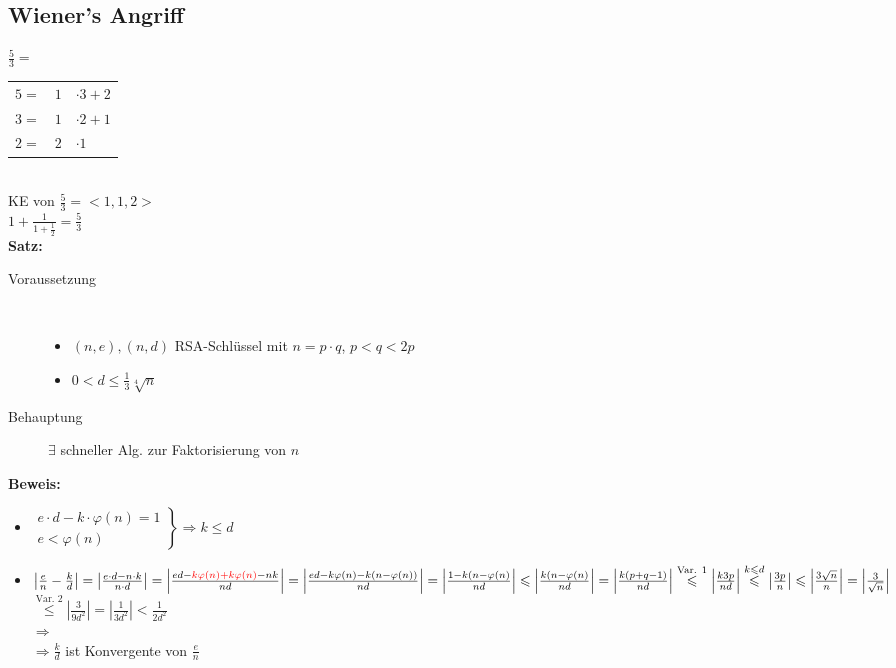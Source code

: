 \documentclass[10pt]{article}
\newcommand{\Bold}[1]{\textbf{#1}} %
\newcommand{\T}[1]{\text{#1}} %
\newcommand{\Ra}{\Rightarrow}
\newcommand{\Abs}[1]{\left| #1 \right|} %
\newcommand{\Brackar}[2]{\left.\begin{array}{#1} #2 \end{array}\right\rbrace} %
\newcommand{\Oneover}[1]{\frac{1}{#1}} %
\newcommand{\Oben}[2]{\overset{#1}{#2}} %
\begin{document}
\subsection{Wiener's Angriff}
$\frac{5}{3}=$\\
\begin{tabular}{l|c|l}\cline{2-1}
 $5=$&$1$&$\cdot3+2$\\
 $3=$&$1$&$\cdot2+1$\\
 $2=$&$2$&$\cdot1$\\\cline{2-1}
\end{tabular}\\\linebreak
{\color{red}KE von $\frac{5}{3}=<1,1,2>$}\\
$1+\frac{1}{1+\frac{1}{2}}=\frac{5}{3}$\\
\Bold{Satz:}
\begin{description}
 \item [Voraussetzung] \hfill \\
    \begin{itemize}
      \item $(n,e),(n,d)$ RSA-Schlüssel mit $n=p\cdot q$, $p<q<2p$
      \item $0<d\leqslant\Oneover{3}\sqrt[4]{n}$
    \end{itemize}
 \item [Behauptung] $\exists$ schneller Alg. zur Faktorisierung von $n$
\end{description}
\Bold{Beweis:}
\begin{itemize}
 \item $\Brackar{l}{e\cdot d-k\cdot \varphi(n)=1\\e<\varphi(n)}\Ra k\leqslant d$
 \item $\Abs{\frac{e}{n}-\frac{k}{d}}=\Abs{\frac{e\cdot d-n\cdot k}{n\cdot d}}=\Abs{\frac{ed-{\color{red}k\varphi(n)+k\varphi(n)}-nk}{nd}}=\Abs{\frac{ed-k\varphi(n)-k(n-\varphi(n))}{nd}}=\Abs{\frac{1-k(n-\varphi(n)}{nd}}\leqslant\Abs{\frac{k(n-\varphi(n)}{nd}}=\Abs{\frac{k(p+q-1)}{nd}}\Oben{\T{Var. 1}}{\leqslant}\Abs{\frac{k3p}{nd}}\Oben{k\leqslant d}{\leqslant}\Abs{\frac{3p}{n}}\leqslant\Abs{\frac{3\sqrt{n}}{n}}=\Abs{\frac{3}{\sqrt{n}}}$\\
 \hspace*{1.65cm}$\Oben{\T{Var. 2}}{\leqslant}\Abs{\frac{3}{9d^2}}=\Abs{\Oneover{3d^2}}<\Oneover{2d^2}$\\
 $\Ra$\fbox{$\Abs{\frac{e}{n}-\frac{k}{d}}<\Oneover{2d^2}$}\\
 $\Ra\frac{k}{d}$ ist Konvergente von $\frac{e}{n}$
\end{itemize}
\end{document}
